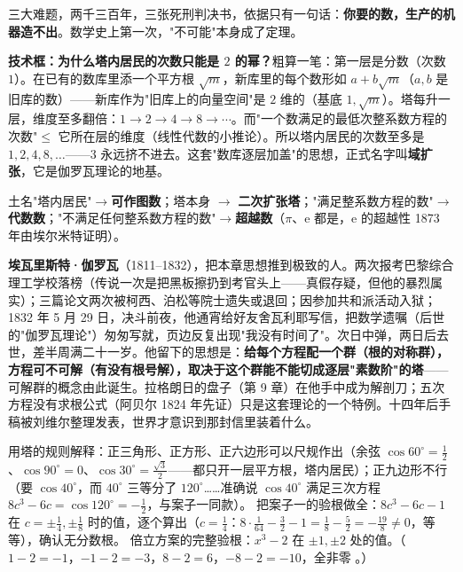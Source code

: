 三大难题，两千三百年，三张死刑判决书，依据只有一句话：\textbf{你要的数，生产的机器造不出}。数学史上第一次，"不可能"本身成了定理。

\begin{gongju}
\textbf{技术框：为什么塔内居民的次数只能是 $2$ 的幂？}粗算一笔：第一层是分数（次数 $1$）。在已有的数库里添一个平方根 $\sqrt{m}$，新库里的每个数形如 $a + b\sqrt m$（$a, b$ 是旧库的数）——新库作为"旧库上的向量空间"是 $2$ 维的（基底 $1, \sqrt m$）。塔每升一层，维度至多翻倍：$1 \to 2 \to 4 \to 8 \to \cdots$。而"一个数满足的最低次整系数方程的次数"$\le$ 它所在层的维度（线性代数的小推论）。所以塔内居民的次数至多是 $1, 2, 4, 8, \dots$——$3$ 永远挤不进去。这套"数库逐层加盖"的思想，正式名字叫\textbf{域扩张}，它是伽罗瓦理论的地基。
\end{gongju}

\begin{cidian}
土名"塔内居民"$\to$\textbf{可作图数}；塔本身 $\to$ \textbf{二次扩张塔}；"满足整系数方程的数"$\to$\textbf{代数数}；"不满足任何整系数方程的数"$\to$\textbf{超越数}（$\pi$、$\mathrm{e}$ 都是，$\mathrm{e}$ 的超越性 1873 年由埃尔米特证明）。
\end{cidian}

\begin{lishi}
\textbf{埃瓦里斯特·伽罗瓦}（1811--1832），把本章思想推到极致的人。两次报考巴黎综合理工学校落榜（传说一次是把黑板擦扔到考官头上——真假存疑，但他的暴烈属实）；三篇论文两次被柯西、泊松等院士遗失或退回；因参加共和派活动入狱；1832 年 5 月 29 日，决斗前夜，他通宵给好友舍瓦利耶写信，把数学遗嘱（后世的"伽罗瓦理论"）匆匆写就，页边反复出现"我没有时间了"。次日中弹，两日后去世，差半周满二十一岁。他留下的思想是：\textbf{给每个方程配一个群（根的对称群），方程可不可解（有没有根号解），取决于这个群能不能切成逐层"素数阶"的塔}——可解群的概念由此诞生。拉格朗日的盘子（第 9 章）在他手中成为解剖刀；五次方程没有求根公式（阿贝尔 1824 年先证）只是这套理论的一个特例。十四年后手稿被刘维尔整理发表，世界才意识到那封信里装着什么。
\end{lishi}

\begin{dongshou}
\begin{itemize}
  \yisi 用塔的规则解释：正三角形、正方形、正六边形可以尺规作出（余弦 $\cos 60^\circ = \tfrac12$、$\cos 90^\circ = 0$、$\cos 30^\circ = \tfrac{\sqrt3}{2}$——都只开一层平方根，塔内居民）；正九边形不行（要 $\cos 40^\circ$，而 $40^\circ$ 三等分了 $120^\circ$……准确说 $\cos 40^\circ$ 满足三次方程 $8c^3 - 6c = \cos 120^\circ = -\tfrac12$，与案子一同款）。
  \yier 把案子一的验根做全：$8c^3 - 6c - 1$ 在 $c = \pm\tfrac14, \pm\tfrac18$ 时的值，逐个算出（$c = \tfrac14$：$8\cdot\tfrac1{64} - \tfrac32 - 1 = \tfrac18 - \tfrac52 = -\tfrac{19}{8} \ne 0$，等等），确认无分数根。
  \yier 倍立方案的完整验根：$x^3 - 2$ 在 $\pm1, \pm2$ 处的值。（$1-2 = -1$，$-1-2 = -3$，$8-2 = 6$，$-8-2 = -10$，全非零 \checkmark。）
\end{itemize}
\end{dongshou}

